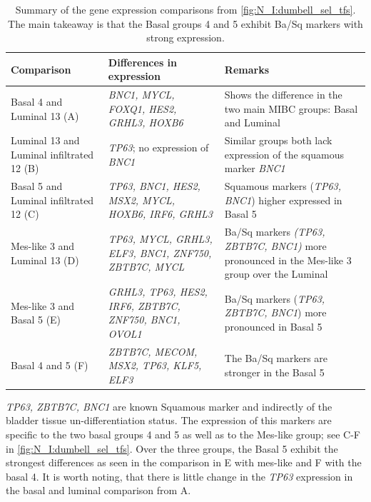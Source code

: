 \begin{table}[!t]
    \centering
    \scriptsize
    \begin{tabularx}{\textwidth}{>{\hsize=0.8\hsize}X|>{\hsize=0.8\hsize}X|>{\hsize=1.4\hsize}X}
        \toprule
        \textbf{Comparison} & \textbf{Differences in expression} & \textbf{Remarks} \\
        \midrule
        Basal 4 and Luminal 13 (A) & \textit{BNC1, MYCL, FOXQ1, HES2, GRHL3, HOXB6} & Shows the difference in the two main MIBC groups: Basal and Luminal \\
        \midrule
        Luminal 13 and Luminal infiltrated 12 (B) & \textit{TP63}; no expression of \textit{BNC1} & Similar groups both lack expression of the squamous marker \textit{BNC1} \\
        \midrule
        Basal 5 and Luminal infiltrated 12 (C) & \textit{TP63, BNC1, HES2, MSX2, MYCL, HOXB6, IRF6, GRHL3} & Squamous markers (\textit{TP63, BNC1}) higher expressed in Basal 5 \\
        \midrule
        Mes-like 3 and Luminal 13 (D) & \textit{TP63, MYCL, GRHL3, ELF3, BNC1, ZNF750, ZBTB7C, MYCL} & Ba/Sq markers \textit{(TP63, ZBTB7C, BNC1)} more pronounced in the Mes-like 3 group over the Luminal \\
        \midrule
        Mes-like 3 and  Basal 5 (E) & \textit{GRHL3, TP63, HES2, IRF6, ZBTB7C, ZNF750, BNC1, OVOL1} & Ba/Sq markers (\textit{TP63, ZBTB7C, BNC1}) more pronounced in Basal 5 \\
        \midrule
        Basal 4 and 5 (F) & \textit{ZBTB7C, MECOM, MSX2, TP63, KLF5, ELF3} & The Ba/Sq markers are stronger in the Basal 5 \\
        \bottomrule
    \end{tabularx}
    \caption[Summary of the gene expressions]{Summary of the gene expression comparisons from \cref{fig:N_I:dumbell_sel_tfs}. The main takeaway is that the Basal groups 4 and 5 exhibit Ba/Sq markers with strong expression.}
    \label{tab:N_I:dumbel_summarry}
\end{table}

\textit{TP63, ZBTB7C, BNC1} are known Squamous marker \citep{Robertson2023-na,Fishwick2017-kd} and indirectly of the bladder tissue un-differentiation status. The expression of this markers are specific to the two basal groups 4 and 5 as well as to the Mes-like group; see C-F in \cref{fig:N_I:dumbell_sel_tfs}.  Over the three groups, the Basal 5 exhibit the strongest differences as seen in the comparison in E with mes-like and F with the basal 4. It is worth noting, that there is little change in the \textit{TP63} expression in the basal and luminal comparison from A. 

